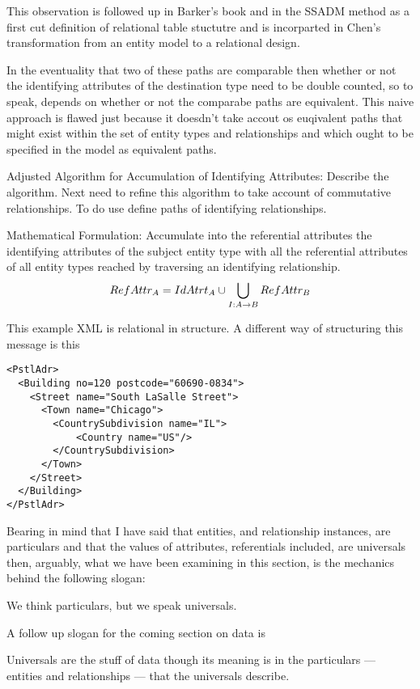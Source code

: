 This observation is followed up in Barker's book and in the SSADM method as a first cut definition of relational table stuctutre and is incorparted in Chen's transformation from an entity model to a relational design.

In the eventuality that two of these paths are comparable then whether or not the identifying attributes of the destination type need to be double counted, so to speak,
depends on whether or not the comparabe paths are equivalent.
\mynote
This naive approach is flawed just because it doesdn't take accout os euqivalent paths that might exist within the set of entity types and relationships and which ought to be specified in the model as equivalent paths.

\mynote 
Adjusted Algorithm for Accumulation of Identifying Attributes:
Describe the algorithm.
Next need to refine this algorithm to take account of commutative relationships. 
To do use define paths of identifying relationships.

\mynote
Mathematical Formulation:
Accumulate into the referential attributes the identifying attributes of the subject entity type
with all the referential attributes of all entity types reached by traversing an identifying relationship.
$$RefAttr_A=IdAtrt_A \cup \bigcup_{I:A \rightarrow B}RefAttr_B$$

\mynote
This example XML is relational in structure. A different way of structuring this message
is this
\begin{verbatim}
<PstlAdr>
  <Building no=120 postcode="60690-0834">
    <Street name="South LaSalle Street">
      <Town name="Chicago">
        <CountrySubdivision name="IL">
            <Country name="US"/>
        </CountrySubdivision>
      </Town>
    </Street>
  </Building>
</PstlAdr>
\end{verbatim}

\mynote
Bearing in mind that I have said that entities, and relationship instances, are particulars
and that the values of attributes, referentials included, are universals then, arguably,
 what we have been examining in this section, 
 is the mechanics behind the following slogan:
\begin{erquote}
We think particulars, but we speak universals.
\end{erquote}
\begin{noteforfuture}
\mynote
A follow up slogan for the coming section on data is
\begin{erquote}
Universals are the stuff of data though its meaning is in the 
particulars --- entities and relationships --- that the universals describe. 
\end{erquote}
\end{noteforfuture}

